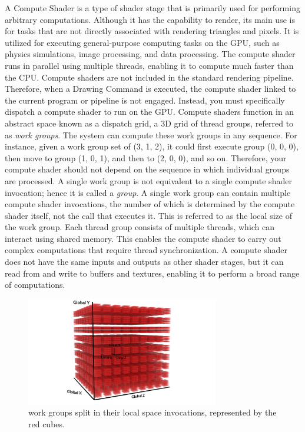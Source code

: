 \documentclass{article}
\begin{document}
A Compute Shader is a type of shader stage that is primarily used for performing arbitrary 
computations. Although it has the capability to render, its main use is for tasks that are not 
directly associated with rendering triangles and pixels. It is utilized for executing 
general-purpose computing tasks on the GPU, such as physics simulations, image processing, and 
data processing. The compute shader runs in parallel using multiple threads, enabling it to 
compute much faster than the CPU. Compute shaders are not included in the standard rendering 
pipeline. Therefore, when a Drawing Command is executed, the compute shader linked to the current 
program or pipeline is not engaged. Instead, you must specifically dispatch a compute shader to run 
on the GPU. Compute shaders function in an abstract space known as a dispatch grid, a 3D grid of 
thread groups, referred to as \textit{work groups}. The system can compute these work groups in any 
sequence. For instance, given a work group set of (3, 1, 2), it could first execute group (0, 0, 0), 
then move to group (1, 0, 1), and then to (2, 0, 0), and so on. Therefore, your compute shader 
should not depend on the sequence in which individual groups are processed. A single work group is 
not equivalent to a single compute shader invocation; hence it is called a \textit{group}. A single 
work group can contain multiple compute shader invocations, the number of which is determined by 
the compute shader itself, not the call that executes it. This is referred to as the local size of 
the work group. Each thread group consists of multiple threads, which can interact using shared 
memory. This enables the compute shader to carry out complex computations that require thread 
synchronization. A compute shader does not have the same inputs and outputs as other shader stages, 
but it can read from and write to buffers and textures, enabling it to perform a broad range of 
computations.

\begin{figure}[H]
	\centering
	\includegraphics[width=0.75\textwidth]{img/work_groups.png}
	\caption{work groups split in their local space invocations, represented by the red cubes.}
	\label{fig:work_groups}
\end{figure}
\end{document}
